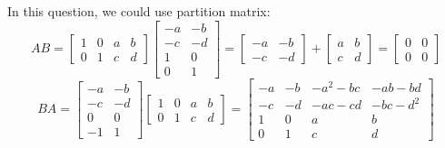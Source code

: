 \documentclass[11pt]{homework}
\begin{document}
    \question
    In this question, we could use partition matrix:
    \begin{equation}
        AB=
        \left[\begin{array}{cc|cc}
        1 & 0 & a & b \\ 
        0 & 1 & c & d
        \end{array}\right]
        \left[\begin{array}{cc}
        -a & -b \\ 
        -c & -d \\ 
        \hline
        1 & 0 \\ 
        0 & 1
        \end{array}\right]=
        \left[\begin{array}{cc}
        -a & -b \\ 
        -c & -d
        \end{array}\right]+
        \left[\begin{array}{cc}
        a & b \\ 
        c & d
        \end{array}\right]=
        \left[\begin{array}{cc}
        0 & 0 \\ 
        0 & 0
        \end{array}\right]
    \end{equation}
    \begin{equation}
        BA=
        \left[\begin{array}{cc}
        -a & -b \\ 
        -c & -d \\ 
        \hline
        0 & 0 \\ 
        -1 & 1
        \end{array}\right]
        \left[\begin{array}{cc|cc}
        1 & 0 & a & b \\ 
        0 & 1 & c & d
        \end{array}\right]=
        \left[\begin{array}{cccc}
        -a & -b & -a^2-bc & -ab-bd \\ 
        -c & -d & -ac-cd & -bc-d^2 \\ 
        1 & 0 & a & b \\ 
        0 & 1 & c & d
        \end{array}\right]
    \end{equation}
    
\end{document}
